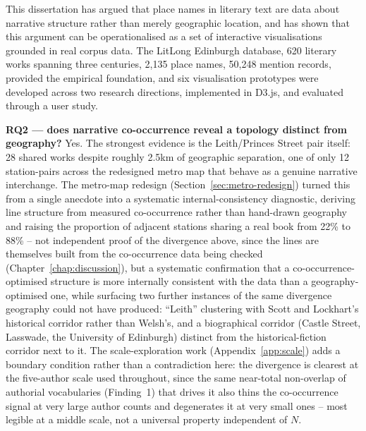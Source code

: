 \documentclass[logo,msc]{infthesis}
\begin{document}
This dissertation has argued that place names in literary text are data about narrative structure rather than merely geographic location, and has shown that this argument can be operationalised as a set of interactive visualisations grounded in real corpus data. The LitLong Edinburgh database, 620 literary works spanning three centuries, 2,135 place names, 50,248 mention records, provided the empirical foundation, and six visualisation prototypes were developed across two research directions, implemented in D3.js, and evaluated through a user study.

\textbf{RQ2 --- does narrative co-occurrence reveal a topology distinct from geography?} Yes. The strongest evidence is the Leith/Princes Street pair itself: 28 shared works despite roughly 2.5km of geographic separation, one of only 12 station-pairs across the redesigned metro map that behave as a genuine narrative interchange. The metro-map redesign (Section~\ref{sec:metro-redesign}) turned this from a single anecdote into a systematic internal-consistency diagnostic, deriving line structure from measured co-occurrence rather than hand-drawn geography and raising the proportion of adjacent stations sharing a real book from 22\% to 88\% -- not independent proof of the divergence above, since the lines are themselves built from the co-occurrence data being checked (Chapter~\ref{chap:discussion}), but a systematic confirmation that a co-occurrence-optimised structure is more internally consistent with the data than a geography-optimised one, while surfacing two further instances of the same divergence geography could not have produced: ``Leith'' clustering with Scott and Lockhart's historical corridor rather than Welsh's, and a biographical corridor (Castle Street, Lasswade, the University of Edinburgh) distinct from the historical-fiction corridor next to it. The scale-exploration work (Appendix~\ref{app:scale}) adds a boundary condition rather than a contradiction here: the divergence is clearest at the five-author scale used throughout, since the same near-total non-overlap of authorial vocabularies (Finding~1) that drives it also thins the co-occurrence signal at very large author counts and degenerates it at very small ones -- most legible at a middle scale, not a universal property independent of $N$.
\end{document}
